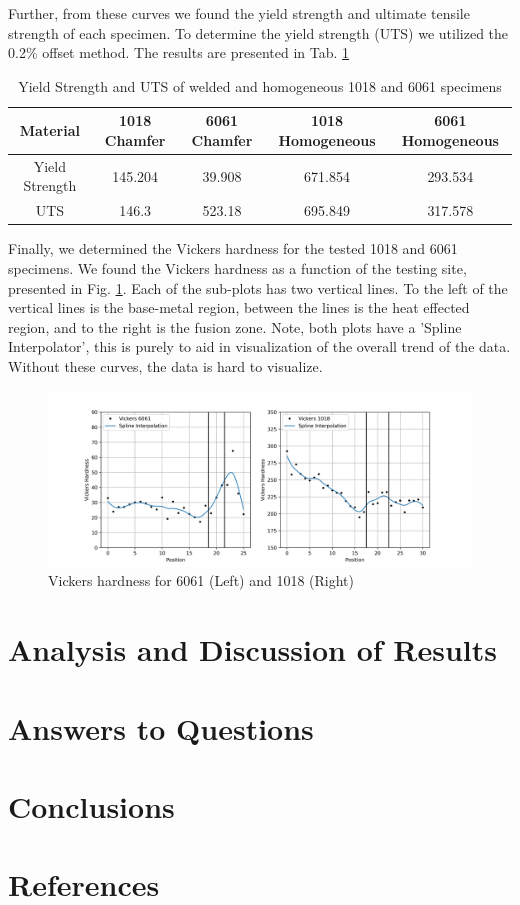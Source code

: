 \documentclass{article}
\begin{document}
\newpage
Further, from these curves we found the yield strength and ultimate tensile strength of each specimen. To determine the yield strength (UTS) we utilized the 0.2\% offset method. The results are presented in Tab. \ref{tab:q2lab7}

\begin{table}[!hp!]
    \centering
    \caption{Yield Strength and UTS of welded and homogeneous 1018 and 6061 specimens}
    \begin{tabular}{|c|c|c|c|c|}
        \toprule
        \bottomrule
        Material & 1018 Chamfer & 6061 Chamfer & 1018 Homogeneous & 6061 Homogeneous \\
        \toprule
        \bottomrule
        Yield Strength & 145.204 & 39.908 & 671.854 & 293.534 \\
        \hline
        UTS & 146.3 & 523.18 & 695.849 & 317.578 \\
        \hline
    \end{tabular}
    \label{tab:q2lab7}
\end{table}

Finally, we determined the Vickers hardness for the tested 1018 and 6061 specimens. We found the Vickers hardness as a function of the testing site, presented in Fig. \ref{fig:q4}. Each of the sub-plots has two vertical lines. To the left of the vertical lines is the base-metal region, between the lines is the heat effected region, and to the right is the fusion zone. Note, both plots have a 'Spline Interpolator', this is purely to aid in visualization of the overall trend of the data. Without these curves, the data is hard to visualize.  

\begin{figure}[!hp!]
    \centering
    \includegraphics[width=\linewidth]{plots/q4.png}
    \caption{Vickers hardness for 6061 (Left) and 1018 (Right)}
    \label{fig:q4}
\end{figure}

\newpage
\section{Analysis and Discussion of Results}

\section{Answers to Questions}

\section{Conclusions}

\section{References}

\printbibliography[heading = none]
\end{document}
